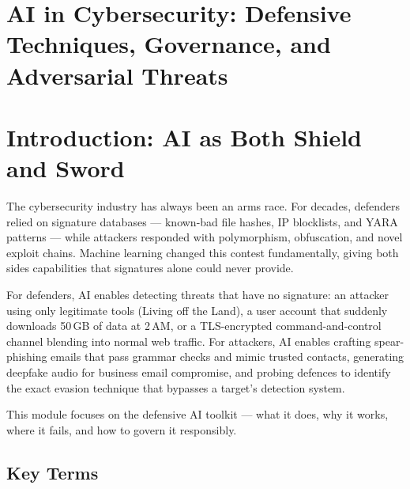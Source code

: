 \documentclass[12pt,a4paper]{article}
\begin{document}
\section*{AI in Cybersecurity: Defensive Techniques, Governance, and Adversarial Threats}

\section{Introduction: AI as Both Shield and Sword}

The cybersecurity industry has always been an arms race. For decades, defenders relied on signature databases --- known-bad file hashes, IP blocklists, and YARA patterns --- while attackers responded with polymorphism, obfuscation, and novel exploit chains. Machine learning changed this contest fundamentally, giving both sides capabilities that signatures alone could never provide.

For defenders, AI enables detecting threats that have no signature: an attacker using only legitimate tools (Living off the Land), a user account that suddenly downloads 50\,GB of data at 2\,AM, or a TLS-encrypted command-and-control channel blending into normal web traffic. For attackers, AI enables crafting spear-phishing emails that pass grammar checks and mimic trusted contacts, generating deepfake audio for business email compromise, and probing defences to identify the exact evasion technique that bypasses a target's detection system.

This module focuses on the defensive AI toolkit --- what it does, why it works, where it fails, and how to govern it responsibly.

\subsection{Key Terms}
\end{document}
